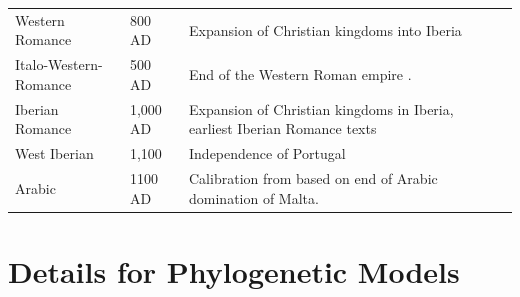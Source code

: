 \documentclass[11pt,a4paper]{article}
\begin{document}
\begin{longtable}{llp{10cm}lll}
Western Romance & 800 AD & Expansion of Christian kingdoms into Iberia \\
Italo-Western-Romance & 500 AD & End of the Western Roman empire \citep{holman2011automated}.  \\
Iberian Romance & 1,000 AD & Expansion of Christian kingdoms in Iberia, earliest Iberian Romance texts \\
West Iberian & 1,100 & Independence of Portugal \\
Arabic & 1100 AD & Calibration from \citep{holman2011automated} based on end of Arabic domination of Malta.
\end{longtable}


\section{Details for Phylogenetic Models}









\end{document}
